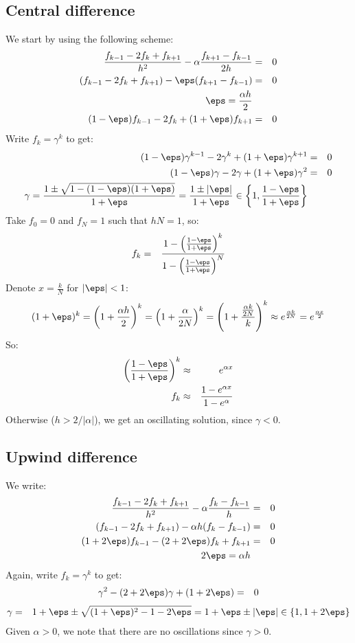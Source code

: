 \subsection{Central difference}
We start by using the following scheme:
\begin{eqnarray}
  \frac{f_{k-1}-2f_k+f_{k+1}}{h^2}
  - \alpha \frac{f_{k+1}-f_{k-1}}{2h} &=& 0 \\
(f_{k-1}-2f_k+f_{k+1}) - \eps (f_{k+1}-f_{k-1}) &=& 0 \\
\eps = \frac{\alpha h}{2} \\
(1-\eps)f_{k-1}-2f_k+(1+\eps)f_{k+1} &=& 0
\end{eqnarray}
Write $f_k = \gamma^k$ to get:
\begin{eqnarray}
  (1-\eps)\gamma^{k-1} - 2\gamma^k + (1+\eps)\gamma^{k+1}&=& 0 \\
  (1-\eps)\gamma - 2\gamma + (1+\eps)\gamma^2&=& 0 \\
  \gamma = \frac{1 \pm \sqrt{1 - (1-\eps)(1+\eps)}}{1+\eps}
         = \frac{1 \pm |\eps|}{1+\eps} \in
           \left\{1, \frac{1- \eps}{1+\eps}\right\}
\end{eqnarray}
Take $f_0 = 0$ and $f_N = 1$ such that $h N = 1$, so:
\begin{eqnarray}
  f_k &=& \frac{1 - \left(\frac{1- \eps}{1+\eps}\right)^k}
  {1 - \left(\frac{1- \eps}{1+\eps}\right)^N}
\end{eqnarray}
Denote $x = \frac{k}{N}$ for $|\eps| < 1$:
\begin{eqnarray}
(1+\eps)^k = \left(1+\frac{\alpha h}{2}\right)^k =
\left(1+\frac{\alpha}{2N}\right)^k =
\left(1+\frac{\frac{\alpha k}{2N}}{k}\right)^k \approx
e^{\frac{\alpha k}{2N}} = e^{\frac{\alpha x}{2}}
\end{eqnarray}
So:
\begin{eqnarray}
  \left(\frac{1- \eps}{1+\eps}\right)^k &\approx& e^{\alpha x} \\
  f_k &\approx& \frac{1 - e^{\alpha x}}{1 - e^{\alpha}}
\end{eqnarray}
Otherwise ($h > 2/|\alpha|$), we get an oscillating solution, since $\gamma < 0$.
\subsection{Upwind difference}
We write:
\begin{eqnarray}
\frac{f_{k-1}-2f_k+f_{k+1}}{h^2} - \alpha \frac{f_k - f_{k-1}}{h} &=& 0 \\
(f_{k-1}-2f_k+f_{k+1}) - \alpha h (f_k - f_{k-1}) &=& 0 \\
(1 + 2\eps)f_{k-1}- (2 + 2\eps)f_k + f_{k+1} &=& 0 \\
2\eps = \alpha h
\end{eqnarray}
Again, write $f_k = \gamma^k$ to get:
\begin{eqnarray}
 \gamma^2 - (2 + 2\eps) \gamma + (1 + 2\eps) &=& 0
\end{eqnarray}
\begin{eqnarray}
\gamma &=& 1+\eps \pm \sqrt{(1+\eps)^2 - 1 - 2\eps} = 1 + \eps \pm |\eps| \in \{1, 1+2\eps\}
\end{eqnarray}
Given $\alpha > 0$, we note that there are no oscillations since $\gamma > 0$.


